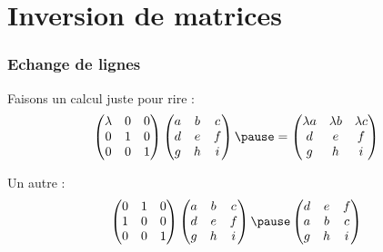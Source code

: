 \section{Inversion de matrices}
\begin{frame}
  \frametitle{Echange de lignes}
  Faisons un calcul juste pour rire : \pause{}
  \begin{equation*}
    \begin{pmatrix}
      \lambda   & 0         & 0         \\
      0         & 1         & 0         \\
      0         & 0         & 1
    \end{pmatrix}
    \begin{pmatrix}
      a         & b         & c         \\
      d         & e         & f         \\
      g         & h         & i
    \end{pmatrix}\pause
    =
    \begin{pmatrix}
      \lambda a & \lambda b & \lambda c \\
      d         & e         & f         \\
      g         & h         & i
    \end{pmatrix}
  \end{equation*}\pause{}

  Un autre :
  \begin{equation*}
    \begin{pmatrix}
      0 & 1 & 0 \\
      1 & 0 & 0 \\
      0 & 0 & 1
    \end{pmatrix}
    \begin{pmatrix}
      a & b & c \\
      d & e & f \\
      g & h & i
    \end{pmatrix}\pause
    \begin{pmatrix}
      d & e & f \\
      a & b & c \\
      g & h & i
    \end{pmatrix}
  \end{equation*}\pause{}


\end{frame}

